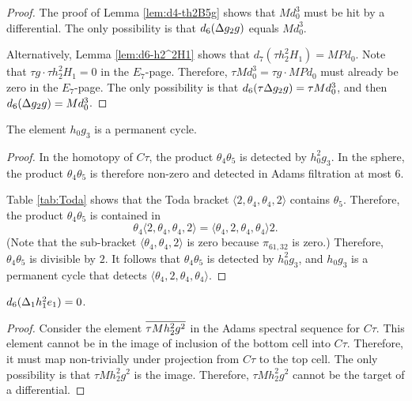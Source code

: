 \begin{proof}
The proof of Lemma \ref{lem:d4-th2B5g} shows that
$M d_0^3$ must be hit by a differential.
The only possibility is that $d_6(\Delta g_2 g)$ equals
$M d_0^3$.

Alternatively, Lemma \ref{lem:d6-h2^2H1} shows that
$d_7(\tau h_2^2 H_1) = M P d_0$.
Note that $\tau g \cdot \tau h_2^2 H_1 = 0$ in the $E_7$-page.
Therefore, $\tau M d_0^3 = \tau g \cdot M P d_0$ must already
be zero in the $E_7$-page.  The only possibility is that
$d_6(\tau \Delta g_2 g) = \tau M d_0^3$, and then
$d_6(\Delta g_2 g) = M d_0^3$.
\end{proof}


\begin{lemma}
\label{lem:perm-h0g3}
The element $h_0 g_3$ is a permanent cycle.
\end{lemma}

\begin{proof}
In the homotopy of $C\tau$, the product $\theta_4 \theta_5$ is detected
by $h_0^2 g_3$.  In the sphere, the product $\theta_4 \theta_5$ 
is therefore non-zero and detected in Adams filtration at most 6.

Table \ref{tab:Toda} shows that 
the Toda bracket $\langle 2, \theta_4, \theta_4, 2 \rangle$
contains $\theta_5$.
Therefore, the product $\theta_4 \theta_5$ is contained in
\[
\theta_4 \langle 2, \theta_4, \theta_4, 2 \rangle =
\langle \theta_4, 2, \theta_4, \theta_4 \rangle 2.
\]
(Note that the sub-bracket $\langle \theta_4, \theta_4, 2 \rangle$
is zero because $\pi_{61,32}$ is zero.)
Therefore, $\theta_4 \theta_5$ is divisible by $2$.
It follows that
$\theta_4 \theta_5$ is detected by $h_0^2 g_3$, and
$h_0 g_3$ is a permanent cycle that detects
$\langle \theta_4, 2, \theta_4, \theta_4 \rangle$.
\end{proof}


\begin{lemma}
\label{lem:d6-D1h1^2e1}
$d_6(\Delta_1 h_1^2 e_1) = 0$.
\end{lemma}

\begin{proof}
Consider the element $\overline{\tau M h_2^2 g^2}$
in the Adams spectral sequence for $C\tau$.
This element cannot be in the image of inclusion of the bottom
cell into $C\tau$.  Therefore,
it must map non-trivially under projection from $C\tau$
to the top cell.
The only possibility is that
$\tau M h_2^2 g^2$ is the image.
Therefore, $\tau M h_2^2 g^2$ cannot be the target of a differential.
\end{proof}

